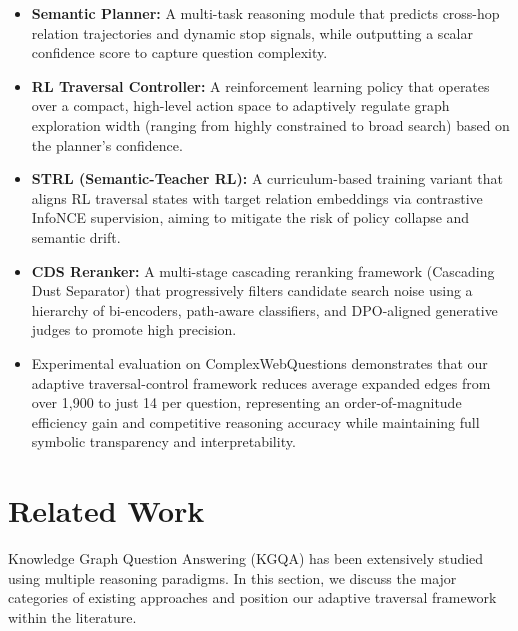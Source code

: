 \documentclass[10pt,conference]{IEEEtran}
\begin{document}
\begin{itemize}

\item \textbf{Semantic Planner:} A multi-task reasoning module that predicts cross-hop relation trajectories and dynamic stop signals, while outputting a scalar confidence score to capture question complexity.

\item \textbf{RL Traversal Controller:} A reinforcement learning policy that operates over a compact, high-level action space to adaptively regulate graph exploration width (ranging from highly constrained to broad search) based on the planner's confidence.

\item \textbf{STRL (Semantic-Teacher RL):} A curriculum-based training variant that aligns RL traversal states with target relation embeddings via contrastive InfoNCE supervision, aiming to mitigate the risk of policy collapse and semantic drift.

\item \textbf{CDS Reranker:} A multi-stage cascading reranking framework (Cascading Dust Separator) that progressively filters candidate search noise using a hierarchy of bi-encoders, path-aware classifiers, and DPO-aligned generative judges to promote high precision.

\item Experimental evaluation on ComplexWebQuestions demonstrates that our adaptive traversal-control framework reduces average expanded edges from over 1,900 to just 14 per question, representing an order-of-magnitude efficiency gain and competitive reasoning accuracy while maintaining full symbolic transparency and interpretability.

\end{itemize}


\section{Related Work}

Knowledge Graph Question Answering (KGQA) has been extensively studied using multiple reasoning paradigms. In this section, we discuss the major categories of existing approaches and position our adaptive traversal framework within the literature.
\end{document}
